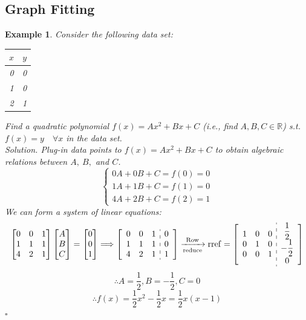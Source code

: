 \documentclass[12pt, a4paper]{article}
\newtheorem{eg}{Example}[subsection]
\newenvironment*{sol}{\indent\textit{Solution. }}{\hfill{$\square$}\par}
\def\R{{\mathbb{R}}}
\def\C{{\mathbb{C}}}
\def\rref{\mathrm{rref}}
\begin{document}
\subsection{Graph Fitting}
\begin{eg}
	Consider the following data set: \begin{center}\begin{tabular}{c|c}$x$&$y$\\\hline0&0\\1&0\\2&1\end{tabular}\end{center} Find a quadratic polynomial $f(x)=Ax^2+Bx+C$ (i.e., find $A,B,C\in\R$) \emph{s.t.} $f(x)=y\quad\forall x$ in the data set.\\ 
	\begin{sol}
		Plug-in data points to $f(x)=Ax^2+Bx+C$ to obtain algebraic relations between $A,\ B,$ and $C$.
		\[\begin{cases}0A+0B+C=f(0)=0\\1A+1B+C=f(1)=0\\4A+2B+C=f(2)=1\end{cases}\]	
		We can form a system of linear equations: 
		\[\begin{bmatrix}0&0&1\\1&1&1\\4&2&1\end{bmatrix}\begin{bmatrix}A\\B\\C\end{bmatrix}=\begin{bmatrix}0\\0\\1\end{bmatrix}\Longrightarrow\left[\begin{array}{c:c}\begin{matrix}0&0&1\\1&1&1\\4&2&1\end{matrix}&\begin{matrix}0\\0\\1\end{matrix}\end{array}\right]\xrightarrow[\text{reduce}]{\text{Row}}\rref=\left[\begin{array}{c:c}\begin{matrix}1&0&0\\0&1&0\\0&0&1\end{matrix}&\begin{matrix}\dfrac{1}{2}\\-\dfrac{1}{2}\\0\end{matrix}\end{array}\right]\]
		\[\therefore A=\frac{1}{2}, B=-\frac{1}{2}, C=0\]
		\[\therefore f(x)=\frac{1}{2}x^2-\frac{1}{2}x=\frac{1}{2}x(x-1)\]
	\end{sol}
\end{eg}
\end{document}
